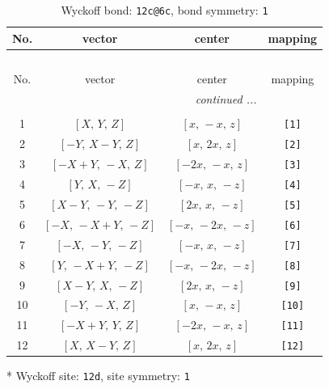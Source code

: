 \documentclass[fleqn,8pt]{jsarticle}
\begin{document}
\begin{longtable}{cccc}
\caption{Wyckoff bond: {\tt 12c@6c}, bond symmetry: {\tt 1}}
 \\
 \hline \hline
No. & vector & center & mapping \\ \hline \endfirsthead

\multicolumn{3}{l}{\tablename\ \thetable{}} \\
 \hline \hline
No. & vector & center & mapping \\ \hline \endhead

 \hline \hline
\multicolumn{3}{r}{\footnotesize\it continued ...} \\ \endfoot

 \hline \hline
\multicolumn{3}{r}{} \\ \endlastfoot

1 & $\left[ X,\, Y,\, Z \right]$ & $\left[ x,\, - x,\, z \right]$ & {\tt [1]} \\ \hline
2 & $\left[ - Y,\, X - Y,\, Z \right]$ & $\left[ x,\, 2 x,\, z \right]$ & {\tt [2]} \\ \hline
3 & $\left[ - X + Y,\, - X,\, Z \right]$ & $\left[ - 2 x,\, - x,\, z \right]$ & {\tt [3]} \\ \hline
4 & $\left[ Y,\, X,\, - Z \right]$ & $\left[ - x,\, x,\, - z \right]$ & {\tt [4]} \\ \hline
5 & $\left[ X - Y,\, - Y,\, - Z \right]$ & $\left[ 2 x,\, x,\, - z \right]$ & {\tt [5]} \\ \hline
6 & $\left[ - X,\, - X + Y,\, - Z \right]$ & $\left[ - x,\, - 2 x,\, - z \right]$ & {\tt [6]} \\ \hline
7 & $\left[ - X,\, - Y,\, - Z \right]$ & $\left[ - x,\, x,\, - z \right]$ & {\tt [7]} \\ \hline
8 & $\left[ Y,\, - X + Y,\, - Z \right]$ & $\left[ - x,\, - 2 x,\, - z \right]$ & {\tt [8]} \\ \hline
9 & $\left[ X - Y,\, X,\, - Z \right]$ & $\left[ 2 x,\, x,\, - z \right]$ & {\tt [9]} \\ \hline
10 & $\left[ - Y,\, - X,\, Z \right]$ & $\left[ x,\, - x,\, z \right]$ & {\tt [10]} \\ \hline
11 & $\left[ - X + Y,\, Y,\, Z \right]$ & $\left[ - 2 x,\, - x,\, z \right]$ & {\tt [11]} \\ \hline
12 & $\left[ X,\, X - Y,\, Z \right]$ & $\left[ x,\, 2 x,\, z \right]$ & {\tt [12]} \\
\end{longtable}
* Wyckoff site: {\tt 12d}, site symmetry: {\tt 1}
\renewcommand{\arraystretch}{1.2}
\end{document}
